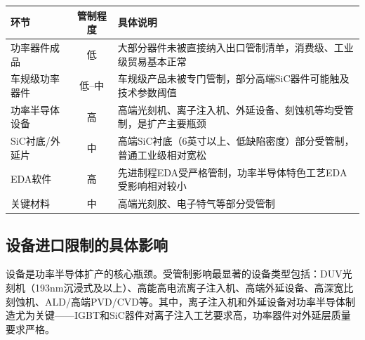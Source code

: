 \begin{exhibitbox}[表 8-4：功率半导体各环节管制程度评估]
\centering
\small
\begin{tabularx}{\textwidth}{X c L{7cm}}
\toprule
\textbf{环节} & \textbf{管制程度} & \textbf{具体说明} \\
\midrule
功率器件成品 & \textcolor{riskgreen}{低} & 大部分器件未被直接纳入出口管制清单，消费级、工业级贸易基本正常 \\
车规级功率器件 & \textcolor{riskgreen}{低--中} & 车规级产品未被专门管制，部分高端SiC器件可能触及技术参数阈值 \\
功率半导体设备 & \textcolor{riskred}{高} & 高端光刻机、离子注入机、外延设备、刻蚀机等均受管制，是扩产主要瓶颈 \\
SiC衬底/外延片 & \textcolor{riskamber}{中} & 高端SiC衬底（6英寸以上、低缺陷密度）部分受管制，普通工业级相对宽松 \\
EDA软件 & \textcolor{riskred}{高} & 先进制程EDA受严格管制，功率半导体特色工艺EDA受影响相对较小 \\
关键材料 & \textcolor{riskamber}{中} & 高端光刻胶、电子特气等部分受管制 \\
\bottomrule
\end{tabularx}
\end{exhibitbox}

\subsection{设备进口限制的具体影响}

设备是功率半导体扩产的核心瓶颈。受管制影响最显著的设备类型包括：DUV光刻机（193nm沉浸式及以上）、高能高电流离子注入机、高端外延设备、高深宽比刻蚀机、ALD/高端PVD/CVD等。其中，离子注入机和外延设备对功率半导体制造尤为关键——IGBT和SiC器件对离子注入工艺要求高，功率器件对外延层质量要求严格。

